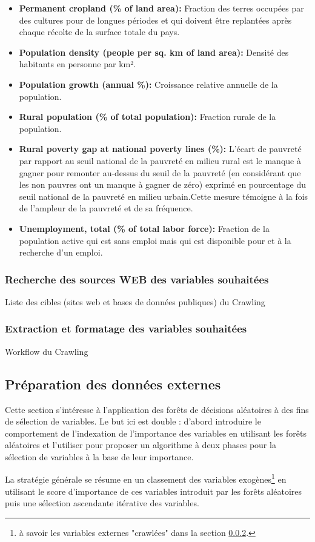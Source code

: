 \begin{itemize}
		\item \textbf{ Permanent cropland (\% of land area):} Fraction des terres occupées par des cultures pour de longues périodes et qui doivent être replantées après chaque récolte de la surface totale du pays.
		\item \textbf{ Population density (people per sq. km of land area):} Densité des habitants en personne par km².
		\item \textbf{ Population growth (annual \%):} Croissance relative annuelle de la population.
		\item \textbf{ Rural population (\% of total population):} Fraction rurale de la population.
		\item \textbf{ Rural poverty gap at national poverty lines (\%):} L'écart de pauvreté par rapport au seuil national de la pauvreté en milieu rural est le manque à gagner pour remonter au-dessus du seuil de la pauvreté (en considérant que les non pauvres ont un manque à gagner de zéro) exprimé en pourcentage du seuil national de la pauvreté en milieu urbain.Cette mesure témoigne à la fois de l'ampleur de la pauvreté et de sa fréquence.
		\item \textbf{ Unemployment, total (\% of total labor force):} Fraction de la population active qui est sans emploi mais qui est disponible pour et à la recherche d'un emploi.
		\end{itemize}
	\subsubsection{Recherche des sources WEB des variables souhaitées}
	\par
	\begin{Huge}{ Liste des cibles (sites web et bases de données publiques) du Crawling }
		\end{Huge}
	\subsubsection{Extraction et formatage des variables souhaitées}\label{crawl}
	\par
	 \begin{Huge}{ Workflow du  Crawling }
	 		\end{Huge}
	
	\subsection{Préparation des données externes}
	Cette section s’intéresse à l'application des forêts de décisions aléatoires à des fins de sélection de variables. Le but ici est double : d'abord introduire le comportement de l'indexation de l'importance des variables en utilisant les forêts aléatoires et l'utiliser pour proposer un algorithme à deux phases pour la sélection de variables à la base de leur importance.\par
	La stratégie générale se résume en un classement des variables exogènes\footnote{à savoir les variables externes "crawlées" dans la section \ref{crawl}.} en utilisant le score d'importance de ces variables introduit par les forêts aléatoires puis une sélection ascendante itérative des variables.
